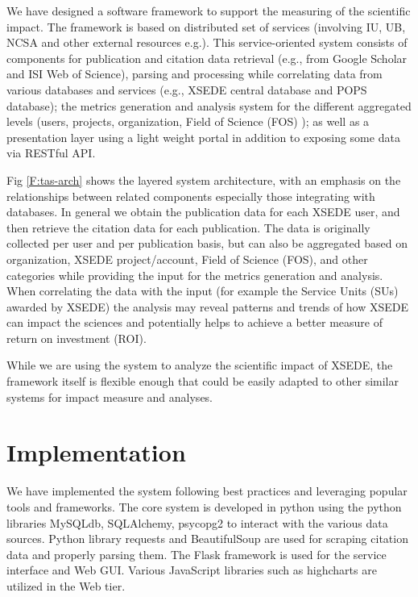 \documentclass{sig-alternate}
\begin{document}
We have designed a software framework to support the measuring of the scientific impact. The framework is based on distributed set of services (involving IU, UB, NCSA and other external resources e.g.). This service-oriented system  consists of components for  publication and citation data retrieval (e.g., from Google Scholar and ISI Web of Science), parsing and processing while correlating data from various databases and services (e.g., XSEDE central database and POPS database); the metrics generation and analysis system for the different aggregated levels (users, projects, organization, Field of Science (FOS) ); as well as a presentation layer using a light weight portal in addition to exposing some data via RESTful API. 
 
Fig \ref{F:tas-arch} shows the layered system architecture, with an emphasis on the relationships between related components especially those integrating with databases. In general we obtain the publication data for each XSEDE user, and then retrieve the citation data for each publication. The data is originally collected per user and per publication basis, but can also be aggregated based on organization, XSEDE project/account, Field of Science (FOS), and other categories while providing the input for the metrics generation and analysis. When correlating the data with the input (for example the Service Units (SUs) awarded by XSEDE) the analysis may reveal patterns and trends of how XSEDE can impact the sciences and potentially helps to achieve a better measure of return on investment (ROI). 
 
While we are using the system to analyze the scientific impact of XSEDE, the framework itself is flexible enough that could be easily adapted to other similar systems for impact measure and analyses. 
 
 
\section{Implementation} \label{S:implementation}
 
We have implemented the system following best practices and leveraging popular tools and frameworks. The core system is developed in python using the  python libraries MySQLdb, SQLAlchemy, psycopg2 to interact with the various data sources. Python library requests and BeautifulSoup are used for scraping citation data and properly parsing them. The Flask framework is used for the service interface and Web GUI. Various JavaScript libraries such as highcharts are utilized in the Web tier. 
 
\end{document}
